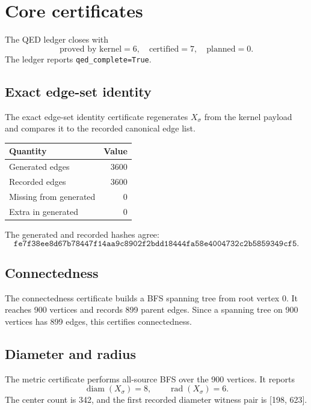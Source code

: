 \section{Core certificates}

The QED ledger closes with
\[
\text{proved by kernel}=6,\quad
\text{certified}=7,\quad
\text{planned}=0.
\]
The ledger reports \texttt{qed\_complete=True}.

\subsection{Exact edge-set identity}

The exact edge-set identity certificate regenerates \(X_\sigma\) from the kernel payload and compares it to the recorded canonical edge list.

\begin{center}
\begin{tabular}{lr}
\toprule
Quantity & Value \\
\midrule
Generated edges & 3600 \\
Recorded edges & 3600 \\
Missing from generated & 0 \\
Extra in generated & 0 \\
\bottomrule
\end{tabular}
\end{center}

The generated and recorded hashes agree:
\[
\texttt{fe7f38ee8d67b78447f14aa9c8902f2bdd18444fa58e4004732c2b5859349cf5}.
\]

\subsection{Connectedness}

The connectedness certificate builds a BFS spanning tree from root vertex 0. It reaches 900 vertices and records 899 parent edges. Since a spanning tree on 900 vertices has 899 edges, this certifies connectedness.

\subsection{Diameter and radius}

The metric certificate performs all-source BFS over the 900 vertices. It reports
\[
\operatorname{diam}(X_\sigma)=8,
\qquad
\operatorname{rad}(X_\sigma)=6.
\]
The center count is 342, and the first recorded diameter witness pair is [198, 623].

